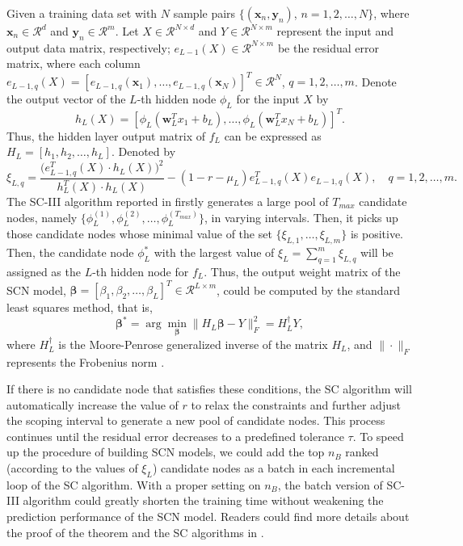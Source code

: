 \documentclass{article}
\begin{document}
Given a training data set with $N$ sample pairs $\{(\bm{x}_n, \bm{y}_n)$, $n=1,2,\ldots,N\}$, where $\bm{x}_n \in \mathcal{R}^d$ and $\bm{y}_n \in \mathcal{R}^m$. 
Let $X \in \mathcal{R}^{N\times d}$ and $Y \in \mathcal{R}^{N\times m}$ represent the input and output data matrix, respectively;  
$e_{L-1}(X) \in \mathcal{R}^{N\times m}$ be the residual error matrix,  where each column $e_{L-1,q}(X)=[e_{L-1,q}(\bm{x}_1),\ldots,e_{L-1,q}(\bm{x}_N)]^T\in \mathcal{R}^N$, $q=1,2,\ldots,m$. 
Denote the output vector of the $L$-th hidden node $\phi_L$ for the input $X$ by 
\begin{equation}
h_L(X)=[\phi_{L}(\bm{w}_L^Tx_1+b_L),\ldots,\phi_{L}(\bm{w}_L^Tx_N+b_L)]^T.
\end{equation}
Thus, the hidden layer output matrix of $f_L$ can be expressed as $H_L=[h_1,h_2,\ldots,h_L]$. Denoted by 
\begin{equation}
\xi_{L,q} = \frac{\Big(e^{T}_{L-1,q}(X)\cdot h_L(X)\Big)^2}{h^{T}_L(X)\cdot h_L(X)} -(1-r-\mu_L)e^{T}_{L-1,q}(X)e_{L-1,q}(X), \quad q = 1,2,\dots, m.
\end{equation}
The SC-III algorithm reported in \cite{WangandLi_SCN} firstly generates a large pool of $T_{max}$ candidate nodes, namely $\{\phi_L^{(1)}, \phi_L^{(2)},\dots, \phi_L^{(T_{max})}\} $, in varying intervals.  
Then, it picks up those candidate nodes whose minimal value of the set $\{\xi_{L,1}, \dots, \xi_{L,m} \}$ is positive.
Then, the candidate node $\phi_L^*$ with the largest value of $\xi_L = \sum_{q=1}^{m}\xi_{L,q}$ will be assigned as the $L$-th hidden node for $f_L$.
Thus, the output weight matrix of the SCN model, $\bm{\beta} = [\beta_1,\beta_2,  \dots, \beta_L]^T \in \mathcal{R}^{L\times m}$, could be computed by the standard least squares method, that is, 
\begin{equation}
  \bm{\beta}^{*}=\arg\min_{\bm{\beta}}\|H_L \bm{\beta}-Y\|_{F}^2=H^{\dagger}_LY,
\end{equation}
where $H^{\dagger}_L$ is the Moore-Penrose generalized inverse of the matrix $H_L$, and $\|\cdot\|_{F}$ represents the Frobenius norm \cite{golub1996Matrix}.

If there is no candidate node that satisfies these conditions, the SC algorithm will automatically increase the value of $r$ to relax the constraints and further adjust the scoping interval to generate a new pool of candidate nodes. This process continues until the residual error decreases to a predefined tolerance $\tau$. To speed up the procedure of building SCN models, we could add the top $n_B$ ranked (according to the values of $\xi_L$) candidate nodes as a batch in each incremental loop of the SC algorithm. With a proper  setting on $n_B$, the batch version of SC-III algorithm could greatly shorten the training time without weakening the prediction performance of the SCN model.
Readers could find more details about the proof of the theorem and the SC algorithms in \cite{WangandLi_SCN}.
\end{document}
